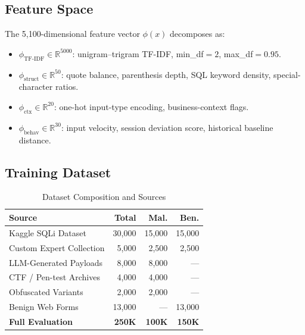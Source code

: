\documentclass[10pt,twocolumn]{article}
\begin{document}
\subsection{Feature Space}

The 5,100-dimensional feature vector $\phi(x)$ decomposes as:
\begin{itemize}[leftmargin=*,itemsep=1pt,topsep=2pt]
  \item $\phi_{\text{TF-IDF}} \in \mathbb{R}^{5000}$: unigram--trigram
        TF-IDF, min\_df$=2$, max\_df$=0.95$.
  \item $\phi_{\text{struct}} \in \mathbb{R}^{50}$: quote balance,
        parenthesis depth, SQL keyword density, special-character ratios.
  \item $\phi_{\text{ctx}} \in \mathbb{R}^{20}$: one-hot input-type
        encoding, business-context flags.
  \item $\phi_{\text{behav}} \in \mathbb{R}^{30}$: input velocity,
        session deviation score, historical baseline distance.
\end{itemize}

\subsection{Training Dataset}

\begin{table}[H]
\centering
\caption{Dataset Composition and Sources}
\label{tab:dataset}
\small
\setlength{\tabcolsep}{4pt}
\begin{tabular}{@{}lrrr@{}}
\toprule
\textbf{Source} & \textbf{Total} & \textbf{Mal.} & \textbf{Ben.} \\
\midrule
Kaggle SQLi Dataset      & 30{,}000  & 15{,}000 & 15{,}000 \\
Custom Expert Collection &  5{,}000  &  2{,}500 &  2{,}500 \\
LLM-Generated Payloads   &  8{,}000  &  8{,}000 & ---      \\
CTF / Pen-test Archives  &  4{,}000  &  4{,}000 & ---      \\
Obfuscated Variants      &  2{,}000  &  2{,}000 & ---      \\
Benign Web Forms         & 13{,}000  &    ---   & 13{,}000 \\
\midrule
\textbf{Full Evaluation} & \textbf{250K} & \textbf{100K} & \textbf{150K} \\
\bottomrule
\end{tabular}
\end{table}
\end{document}
